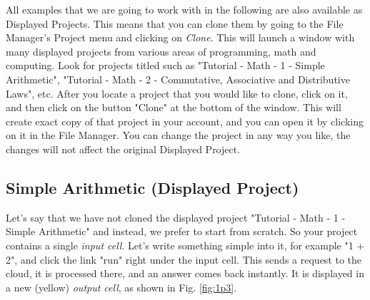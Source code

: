 \documentclass[article,A4,12pt]{llncs}
\begin{document}
All examples that we are going to work with in the following are also available 
as Displayed Projects. This means that you can clone them by going to the
File Manager's Project menu and clicking on {\em Clone}. This will launch 
a window with many displayed projects from various areas of programming,
math and computing. Look for projects titled such as "Tutorial - Math - 1 - Simple Arithmetic",
"Tutorial - Math - 2 - Commutative, Associative and Distributive Laws", etc.
After you locate a project that you would like to clone, click on it,
and then click on the button "Clone" at the bottom of the window. This will
create exact copy of that project in your account, and you can open it 
by clicking on it in the File Manager. You can change the project in any way 
you like, the changes will not affect the original Displayed Project. 

\subsection{Simple Arithmetic (Displayed Project)}

Let's say that we have not cloned the displayed project "Tutorial - Math - 1 - Simple Arithmetic"
and instead, we prefer to start from scratch.
So your project contains a single {\em input cell}. Let's write 
something simple into it, for example "1 + 2", and click 
the link "run" right under the input cell. This sends a request to 
the cloud, it is processed there, and an answer comes back instantly. 
It is displayed in a new (yellow) {\em output cell}, as shown in 
Fig. \ref{fig:1p3}.
\end{document}
